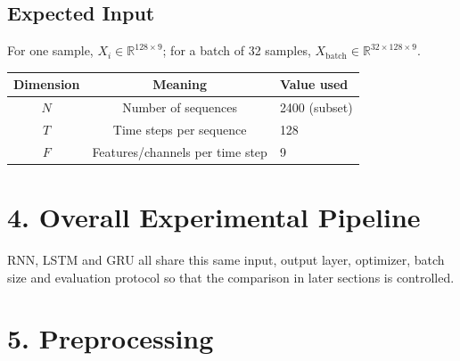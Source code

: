 \documentclass[10pt]{article}
\begin{document}
\subsection*{Expected Input}

For one sample, $X_i\in\mathbb{R}^{128\times9}$; for a batch of 32 samples,
$X_{\mathrm{batch}}\in\mathbb{R}^{32\times128\times9}$.

\begin{center}
\begin{tabular}{|c|c|l|}
\hline
Dimension & Meaning & Value used\\
\hline
$N$ & Number of sequences & 2400 (subset)\\
$T$ & Time steps per sequence & 128\\
$F$ & Features/channels per time step & 9\\
\hline
\end{tabular}
\end{center}

\section*{4. Overall Experimental Pipeline}

\begin{center}
\end{center}

RNN, LSTM and GRU all share this same input, output layer, optimizer, batch
size and evaluation protocol so that the comparison in later sections is
controlled.

\section*{5. Preprocessing}
\end{document}
